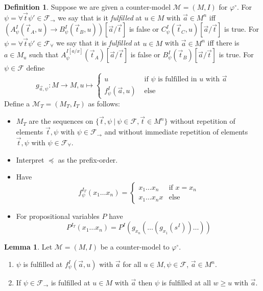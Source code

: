 \documentclass[a4paper,12pt]{report}
\theoremstyle{definition}
\theoremstyle{definition}
\theoremstyle{definition}
\newtheorem{lemma}[theorem]{Lemma}
\theoremstyle{definition}
\theoremstyle{definition}
\newtheorem{definition}[theorem]{Definition}
\theoremstyle{definition}
\theoremstyle{definition}
\begin{document}
	\begin{definition}
		Suppose we are given a counter-model $\mathcal M = (M, I)$ for $\varphi^\circ$. For $\psi = \forall\vec t\psi'\in\mathcal F_\to$ we say that is it \textit{fulfilled} at $u\in M$ with $\vec a\in M^n$ iff $(A_\psi^I(\vec t_A, u)\to B_\psi^I(\vec t_B, u))[\vec a/\vec t]$ is false or $C_\psi^I(\vec t_C, u)[\vec a/\vec t]$ is true.
		For $\psi = \forall\vec t\psi'\in\mathcal F_\forall$ we say that it is \textit{fulfilled} at $u\in M$ with $\vec a\in M^n$ iff there is $a\in M_u$ such that $A^{I[a/x]}_\psi(\vec t_A)[\vec a/\vec t]$ is false or $B_\psi^I(\vec t_B)[\vec a/\vec t]$ is true. For $\psi\in\mathcal F$ define $$g_{\vec a, \psi} : M\to M, u\mapsto\begin{cases}
			u&\text{ if $\psi$ is fulfilled in $u$ with $\vec a$}\\
			f^I_\psi(\vec a, u)&\text{ else}		
		\end{cases}$$		
		Define a $\mathcal M_T = (M_T, I_T)$ as follows:
		\begin{itemize}
			\item $M_T$ are the sequences on $\{ \vec t, \psi\:|\:\psi\in \mathcal F, \vec t\in M^n\}$ without repetition of elements $\vec t,\psi$ with $\psi\in\mathcal F_\to$ and without immediate repetition of elements $\vec t,\psi$ with $\psi\in\mathcal F_\forall$.
			\item Interpret $\preceq$ as the prefix-order.
			\item Have $$f_\psi^{I_T}(x_1\dots x_n) = \begin{cases}
				x_1\dots x_n&\text{if $x=x_n$}\\
				x_1\dots x_nx&\text{else}			
			\end{cases}$$
			\item For propositional variables $P$ have $$P^{I_T}(x_1\dots x_n) = P^I(g_{x_n}(\dots(g_{x_1}(s^I))\dots))$$
		\end{itemize}
	\end{definition}
	
	\begin{lemma}
		Let $\mathcal M = (M, I)$ be a counter-model to $\mathcal \varphi^\circ$.
		\begin{enumerate}
			\item $\psi$ is fulfilled at $f_\psi^I(\vec a, u)$ with $\vec a$ for all $u\in M, \psi\in\mathcal F$, $\vec a\in M^n$.
			\item If $\psi\in\mathcal F_\to$ is fulfilled at $u\in M$ with $\vec a$ then $\psi$ is fulfilled at all $w\geq u$ with $\vec a$.
		\end{enumerate}	
	\end{lemma}
\end{document}
